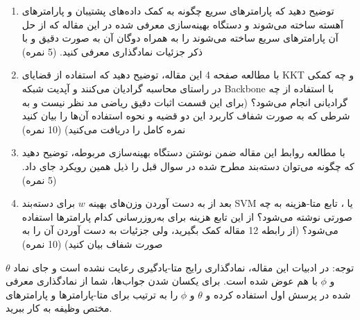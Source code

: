 \documentclass{article}
\begin{document}
\begin{enumerate}
	\item
	توضیح دهید که پارامترهای سریع چگونه به کمک داده‌های پشتیبان و پارامترهای آهسته ساخته می‌شوند و دستگاه بهینه‌سازی معرفی شده در این مقاله که از حل آن پارامترهای سریع ساخته می‌شوند را به همراه دوگان آن به صورت دقیق و با ذکر جزئیات نمادگذاری معرفی کنید. (5 نمره)
	\item
	با مطالعه صفحه 4 این مقاله، توضیح دهید که استفاده از قضایای KKT و 
	چه کمکی در راستای محاسبه گرادیان می‌کنند و آپدیت شبکه Backbone با استفاده از چه گرادیانی انجام می‌شود؟ (برای این قسمت اثبات دقیق ریاضی مد نظر نیست و به شرطی که به صورت شفاف کاربرد این دو قضیه و نحوه استفاده آن‌ها را بیان کنید نمره کامل را دریافت می‌کنید) (10 نمره)
	\item
	با مطالعه روابط این مقاله ضمن نوشتن دستگاه بهینه‌سازی مربوطه، توضیح دهید که چگونه می‌توان دسته‌بند
	مطرح شده در سوال قبل را ذیل همین رویکرد جای داد. (5 نمره)
	\item
	بعد از به دست‌ آوردن وزن‌های بهینه
	$w$
	برای دسته‌بند SVM یا 
	، تابع متا-هزینه به چه صورتی نوشته می‌شود؟ از این تابع هزینه برای به‌روزرسانی کدام پارامترها استفاده می‌شود؟ (از رابطه 12 مقاله کمک بگیرید، ولی جزئیات به دست آوردن آن را به صورت شفاف بیان کنید) (10 نمره)
	
\end{enumerate}

توجه: در ادبیات این مقاله، نمادگذاری رایج متا-یادگیری رعایت نشده است و جای نماد
$\theta$
و
$\phi$
با هم عوض شده است. برای یکسان شدن جواب‌ها، شما از نمادگذاری معرفی شده در پرسش اول استفاده کرده و 
$\theta$ و
$\phi$
را به ترتیب برای متا-پارامترها و پارامترهای مختص وظیفه به کار ببرید.
\end{document}

